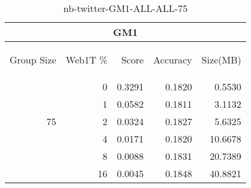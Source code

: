 \begin{center}
\begin{table}[htbp] 
 \begin{center}
\begin{tabular}{ | r | r | r | r | r |}
\hline
\multicolumn{5}{|c|}{GM1}\\
\hline
\begin{sideways}Group Size\end{sideways} & \begin{sideways}Web1T \%\end{sideways} & \begin{sideways}Score\end{sideways} & \begin{sideways}Accuracy\end{sideways} & \begin{sideways}Size(MB)\end{sideways}\\
\hline
\multirow{5}{*}{75}
 & 0 & 0.3291 & 0.1820 & 0.5530\\ \cline{2-5}
 & 1 & 0.0582 & 0.1811 & 3.1132\\ \cline{2-5}
 & 2 & 0.0324 & 0.1827 & 5.6325\\ \cline{2-5}
 & 4 & 0.0171 & 0.1820 & 10.6678\\ \cline{2-5}
 & 8 & 0.0088 & 0.1831 & 20.7389\\ \cline{2-5}
 & 16 & 0.0045 & 0.1848 & 40.8821\\ \cline{2-5}
\hline
\end{tabular}
\caption{nb-twitter-GM1-ALL-ALL-75}
\label{table:nb-twitter-GM1-ALL-ALL-75}
\end{center}
 \end{table}
\end{center}

